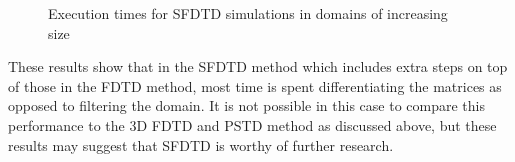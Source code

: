 \begin{figure}[H]
  \caption{Execution times for SFDTD simulations in domains of increasing size}
\end{figure}
These results show that in the SFDTD method which includes extra steps on top of those in the FDTD method, most time is spent differentiating the matrices as opposed to filtering the domain. It is not possible in this case to compare this performance to the 3D FDTD and PSTD method as discussed above, but these results may suggest that SFDTD is worthy of further research.